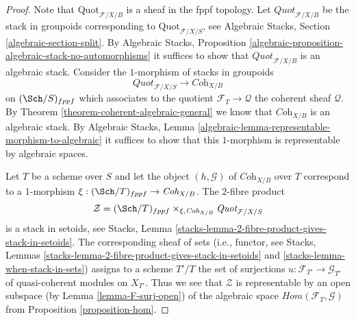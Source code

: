 \begin{proof}
Note that $\text{Quot}_{\mathcal{F}/X/B}$ is a sheaf in the
fppf topology. Let $\textit{Quot}_{\mathcal{F}/X/B}$ be the stack in
groupoids corresponding to $\text{Quot}_{\mathcal{F}/X/S}$, see
Algebraic Stacks, Section \ref{algebraic-section-split}.
By Algebraic Stacks, Proposition
\ref{algebraic-proposition-algebraic-stack-no-automorphisms}
it suffices to show that $\textit{Quot}_{\mathcal{F}/X/B}$
is an algebraic stack.
Consider the $1$-morphism of stacks in groupoids
$$
\textit{Quot}_{\mathcal{F}/X/S}
\longrightarrow
\textit{Coh}_{X/B}
$$
on $(\Sch/S)_{fppf}$ which associates to the quotient
$\mathcal{F}_T \to \mathcal{Q}$ the coherent sheaf $\mathcal{Q}$.
By Theorem \ref{theorem-coherent-algebraic-general} we know that
$\textit{Coh}_{X/B}$ is an algebraic stack.
By Algebraic Stacks, Lemma
\ref{algebraic-lemma-representable-morphism-to-algebraic}
it suffices to show that this $1$-morphism is representable
by algebraic spaces.

\medskip\noindent
Let $T$ be a scheme over $S$ and let the object $(h, \mathcal{G})$ of
$\textit{Coh}_{X/B}$ over $T$ correspond
to a $1$-morphism $\xi : (\Sch/T)_{fppf} \to \textit{Coh}_{X/B}$.
The $2$-fibre product
$$
\mathcal{Z} =
(\Sch/T)_{fppf}
\times_{\xi, \textit{Coh}_{X/B}}
\textit{Quot}_{\mathcal{F}/X/S}
$$
is a stack in setoids, see
Stacks, Lemma \ref{stacks-lemma-2-fibre-product-gives-stack-in-setoids}.
The corresponding sheaf of sets (i.e., functor, see
Stacks, Lemmas
\ref{stacks-lemma-2-fibre-product-gives-stack-in-setoids} and
\ref{stacks-lemma-when-stack-in-sets}) assigns to a scheme
$T'/T$ the set of surjections $u : \mathcal{F}_{T'} \to \mathcal{G}_{T'}$
of quasi-coherent modules on $X_{T'}$. Thus we see that
$\mathcal{Z}$ is representable by an open subspace
(by Lemma \ref{lemma-F-surj-open}) of the algebraic space
$\mathit{Hom}(\mathcal{F}_T, \mathcal{G})$ from
Proposition \ref{proposition-hom}.
\end{proof}














